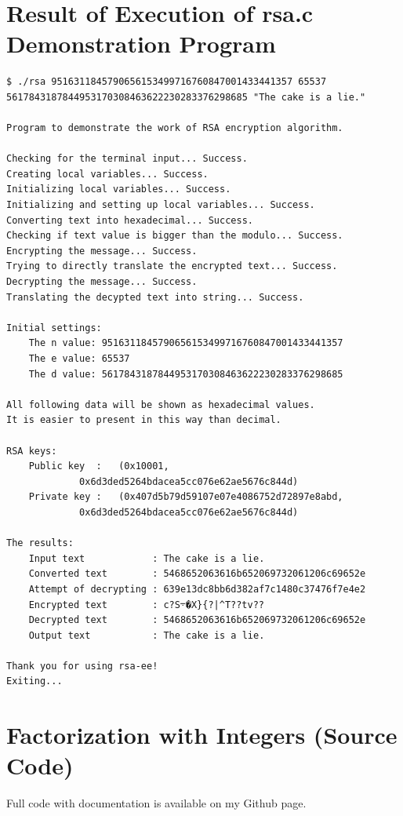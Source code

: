 \documentclass[a4paper, 12pt]{article}
\begin{document}
\newpage

\section{Result of Execution of rsa.c Demonstration Program}

\begin{lstlisting}[caption=Output from the Execution of rsa.c]
$ ./rsa 9516311845790656153499716760847001433441357 65537 5617843187844953170308463622230283376298685 "The cake is a lie."

Program to demonstrate the work of RSA encryption algorithm.

Checking for the terminal input... Success.
Creating local variables... Success.
Initializing local variables... Success.
Initializing and setting up local variables... Success.
Converting text into hexadecimal... Success.
Checking if text value is bigger than the modulo... Success.
Encrypting the message... Success.
Trying to directly translate the encrypted text... Success.
Decrypting the message... Success.
Translating the decypted text into string... Success.

Initial settings:
	The n value: 9516311845790656153499716760847001433441357
	The e value: 65537
	The d value: 5617843187844953170308463622230283376298685

All following data will be shown as hexadecimal values.
It is easier to present in this way than decimal.

RSA keys:
	Public key  :   (0x10001, 
			 0x6d3ded5264bdacea5cc076e62ae5676c844d)
	Private key :   (0x407d5b79d59107e07e4086752d72897e8abd, 
			 0x6d3ded5264bdacea5cc076e62ae5676c844d)

The results:
	Input text            : The cake is a lie.
	Converted text        : 5468652063616b652069732061206c69652e
	Attempt of decrypting : 639e13dc8bb6d382af7c1480c37476f7e4e2
	Encrypted text        : c?S܋�X}{?|^T??tv??
	Decrypted text        : 5468652063616b652069732061206c69652e
	Output text           : The cake is a lie.

Thank you for using rsa-ee!
Exiting...

\end{lstlisting}

\newpage
\section{Factorization with Integers (Source Code)}
\label{fullbrute}
Full code with documentation is available on my Github page.\cite{github}\\
\end{document}
